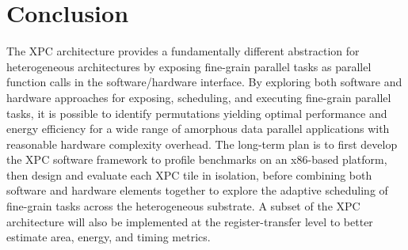 
\section{Conclusion}
\label{sec-conclusion}

The XPC architecture provides a fundamentally different abstraction for
heterogeneous architectures by exposing fine-grain parallel tasks as
parallel function calls in the software/hardware interface. By exploring
both software and hardware approaches for exposing, scheduling, and
executing fine-grain parallel tasks, it is possible to identify
permutations yielding optimal performance and energy efficiency for a
wide range of amorphous data parallel applications with reasonable
hardware complexity overhead.  The long-term plan is to first develop the
XPC software framework to profile benchmarks on an x86-based platform,
then design and evaluate each XPC tile in isolation, before combining
both software and hardware elements together to explore the adaptive
scheduling of fine-grain tasks across the heterogeneous substrate. A
subset of the XPC architecture will also be implemented at the
register-transfer level to better estimate area, energy, and timing
metrics.
